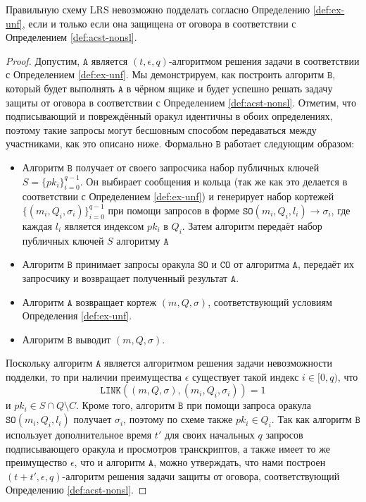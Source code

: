 \documentclass{llncs}
\newcommand{\A}{\texttt{A}}
\newcommand{\B}{\texttt{B}}
\begin{document}
\begin{theorem}\label{thm:nonsl-implies-unf}
Правильную схему LRS невозможно подделать согласно Определению \ref{def:ex-unf}, если и только если она защищена от оговора в соответствии с Определением \ref{def:acst-nonsl}.
\end{theorem}

\begin{proof}
    Допустим, $\A$ является $(t,\epsilon,q)$-алгоритмом решения задачи в соответствии с Определением \ref{def:ex-unf}. Мы демонстрируем, как построить алгоритм $\B$, который будет выполнять $\A$ в чёрном ящике и будет успешно решать задачу защиты от оговора в соответствии с Определением \ref{def:acst-nonsl}. Отметим, что подписывающий и повреждённый оракул идентичны в обоих определениях, поэтому такие запросы могут бесшовным способом передаваться между участниками, как это описано ниже. Формально $\B$ работает следующим образом:
    \begin{itemize}
        \item Алгоритм $\B$ получает от своего запросчика набор публичных ключей $S = \{pk_i\}_{i=0}^{q-1}$. Он выбирает сообщения и кольца (так же как это делается в соответствии с Определением \ref{def:ex-unf}) и генерирует набор кортежей $\{(m_i,Q_i,\sigma_i)\}_{i=0}^{q-1}$ при помощи запросов в форме $\texttt{SO}(m_i,Q_i,l_i) \to \sigma_i$, где каждая $l_i$ является индексом $pk_i$ в $Q_i$. Затем алгоритм передаёт набор публичных ключей $S$ алгоритму $\A$
        \item Алгоритм $\B$ принимает запросы оракула $\texttt{SO}$ и $\texttt{CO}$ от алгоритма $\A$, передаёт их запросчику и возвращает полученный результат $\A$.
        \item Алгоритм $\A$ возвращает кортеж $(m,Q,\sigma)$, соответствующий условиям Определения \ref{def:ex-unf}.
        \item Алгоритм $\B$ выводит $(m,Q,\sigma)$.
    \end{itemize}
    Поскольку алгоритм $\A$ является алгоритмом решения задачи невозможности подделки, то при наличии преимущества $\epsilon$ существует такой индекс $i \in [0,q)$, что $$\texttt{LINK}((m,Q,\sigma),(m_i,Q_i,\sigma_i)) = 1$$ и $pk_i \in S \cap Q \setminus C$. Кроме того, алгоритм $\B$ при помощи запроса оракула $\texttt{SO}(m_i,Q_i,l_i)$ получает $\sigma_i$, поэтому по схеме также $pk_i \in Q_i$. Так как алгоритм $\B$ использует дополнительное время $t'$ для своих начальных $q$ запросов подписывающего оракула и просмотров транскриптов, а также имеет то же преимущество $\epsilon$, что и алгоритм $\A$, можно утверждать, что нами построен $(t+t',\epsilon,q)$-алгоритм решения задачи защиты от оговора, соответствующий Определению \ref{def:acst-nonsl}.


\end{proof}
\end{document}
